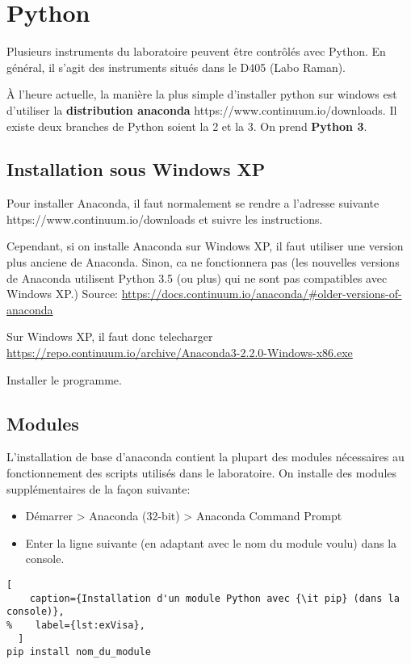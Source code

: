 \documentclass[11pt,francais]{book} %
\begin{document}
\section{Python}

Plusieurs instruments du laboratoire peuvent être contrôlés avec Python.
En général, il s'agit des instruments situés dans le D405 (Labo Raman).

À l'heure actuelle, la manière la plus simple d'installer python sur windows est d'utiliser la {\bf distribution anaconda} https://www.continuum.io/downloads.
Il existe deux branches de Python soient la 2 et la 3. On prend {\bf Python 3}.

\subsection{Installation sous Windows XP}

	Pour installer Anaconda, il faut normalement se rendre a l'adresse suivante
	https://www.continuum.io/downloads
	et suivre les instructions.

	Cependant, si on installe Anaconda sur Windows XP, il faut utiliser une version plus anciene de Anaconda. 
	Sinon, ca ne fonctionnera pas (les nouvelles versions de Anaconda utilisent Python 3.5 (ou plus) qui ne sont pas compatibles avec Windows XP.)
	Source: \url{https://docs.continuum.io/anaconda/#older-versions-of-anaconda}

	Sur Windows XP, il faut donc telecharger
	\url{https://repo.continuum.io/archive/Anaconda3-2.2.0-Windows-x86.exe}

	Installer le programme. 	

\subsection{Modules}

L'installation de base d'anaconda contient la plupart des modules nécessaires au fonctionnement des scripts utilisés dans le laboratoire.
On installe des modules supplémentaires de la fa\c{c}on suivante:
\begin{itemize}
\item Démarrer > Anaconda (32-bit) > Anaconda Command Prompt
 \item Enter la ligne suivante (en adaptant avec le nom du module voulu) dans la console.
\end{itemize}

\begin{lstlisting}[
    caption={Installation d'un module Python avec {\it pip} (dans la console)},
%    label={lst:exVisa},
  ]
pip install nom_du_module
\end{lstlisting}
\end{document}
